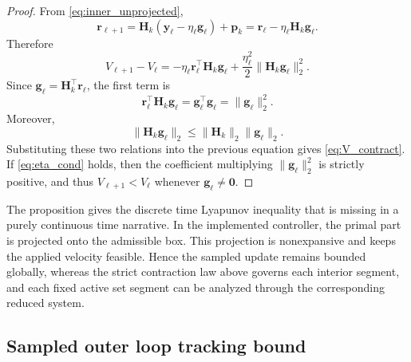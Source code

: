 \begin{proof}
From \eqref{eq:inner_unprojected},
\begin{equation}
  \bm{r}_{\ell+1}
  =
  \bm{H}_k(\bm{y}_\ell - \eta_\ell \bm{g}_\ell) + \bm{p}_k
  =
  \bm{r}_\ell - \eta_\ell \bm{H}_k \bm{g}_\ell.
\end{equation}
Therefore
\begin{equation}
  V_{\ell+1} - V_\ell
  =
  -\eta_\ell \bm{r}_\ell^\top \bm{H}_k \bm{g}_\ell
  + \frac{\eta_\ell^2}{2}\|\bm{H}_k \bm{g}_\ell\|_2^2.
\end{equation}
Since $\bm{g}_\ell = \bm{H}_k^\top \bm{r}_\ell$, the first term is
\begin{equation}
  \bm{r}_\ell^\top \bm{H}_k \bm{g}_\ell
  =
  \bm{g}_\ell^\top \bm{g}_\ell
  =
  \|\bm{g}_\ell\|_2^2.
\end{equation}
Moreover,
\begin{equation}
  \|\bm{H}_k \bm{g}_\ell\|_2
  \le
  \|\bm{H}_k\|_2 \|\bm{g}_\ell\|_2.
\end{equation}
Substituting these two relations into the previous equation gives \eqref{eq:V_contract}. If \eqref{eq:eta_cond} holds, then the coefficient multiplying $\|\bm{g}_\ell\|_2^2$ is strictly positive, and thus $V_{\ell+1} < V_\ell$ whenever $\bm{g}_\ell \neq \bm{0}$.
\end{proof}

The proposition gives the discrete time Lyapunov inequality that is missing in a purely continuous time narrative. In the implemented controller, the primal part is projected onto the admissible box. This projection is nonexpansive and keeps the applied velocity feasible. Hence the sampled update remains bounded globally, whereas the strict contraction law above governs each interior segment, and each fixed active set segment can be analyzed through the corresponding reduced system.

\subsection{Sampled outer loop tracking bound}

